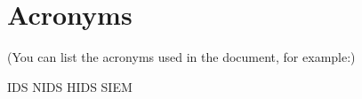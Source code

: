 \chapter*{Acronyms}

(You can list the acronyms used in the document, for example:)

\begin{acronym} 
	
	IDS
	NIDS
	HIDS
	SIEM

\end{acronym} 